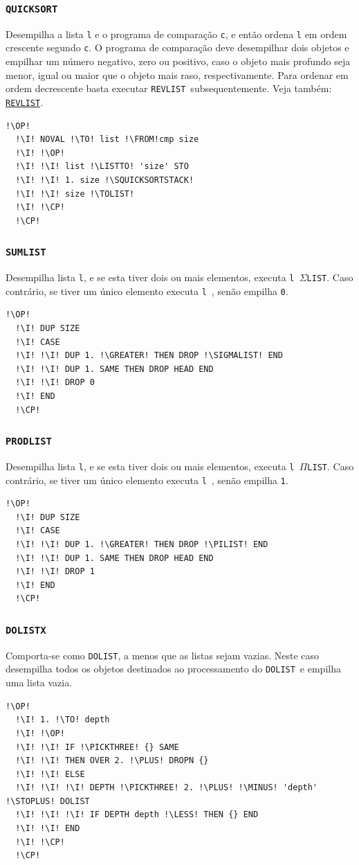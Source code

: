 \documentclass[12pt,a4paper]{report}
\newcommand{\kwd}[1]{\texttt{\textcolor{keyword}{#1}}}
\newcommand{\I}{\enspace\textcolor{indent}\vrule\hspace{2pt}}
\newcommand{\PICKTHREE}{\kwd{PICK3}}   %
\newcommand{\LESS}{\kwd{$<$}}   %
\newcommand{\GREATER}{\kwd{$>$}}   %
\newcommand{\PLUS}{\kwd{+}}   %
\newcommand{\MINUS}{\kwd{-}}   %
\newcommand{\STOPLUS}{\kwd{STO+}} %
\newcommand{\REVLIST}{\kwd{REVLIST}}   %
\newcommand{\TOLIST}{\kwd{$\rightarrow$LIST}} %
\newcommand{\SIGMALIST}{\kwd{$\Sigma$LIST}}   %
\newcommand{\PILIST}{\kwd{$\Pi$LIST}}   %
\newcommand{\DOLIST}{\kwd{DOLIST}} %
\newcommand{\SQUICKSORTSTACK}{\kwd{\$QUICKSORTSTACK}}   %
\newcommand{\QUICKSORT}{\kwd{QUICKSORT}}   %
\newcommand{\SUMLIST}{\kwd{SUMLIST}}   %
\newcommand{\PRODLIST}{\kwd{PRODLIST}}   %
\newcommand{\DOLISTX}{\kwd{DOLISTX}}   %
\newcommand{\OP}{\kwd{$\ll$}}   %
\newcommand{\CP}{\kwd{$\gg$}}   %
\newcommand{\TO}{\kwd{$\rightarrow$}} %
\newcommand{\FROM}{\kwd{$\leftarrow$}} %
\numberwithin{theorem}{chapter}
\begin{document}
\subsubsection{\QUICKSORT}\label{QUICKSORT}
Desempilha a lista \texttt{l} e o programa de comparação \texttt{c}, e
então ordena \texttt{l} em ordem crescente segundo \texttt{c}.  O
programa de comparação deve desempilhar dois objetos e empilhar um
número negativo, zero ou positivo, caso o objeto mais profundo seja
menor, igual ou maior que o objeto mais raso, respectivamente.  Para
ordenar em ordem decrescente basta executar
\REVLIST\ subsequentemente.  Veja também:
\hyperref[REVLIST]{\REVLIST}.
\begin{lstlisting}[language=userrpl]
  !\OP!
  !\I! NOVAL !\TO! list !\FROM!cmp size
  !\I! !\OP!
  !\I! !\I! list !\LISTTO! 'size' STO
  !\I! !\I! 1. size !\SQUICKSORTSTACK!
  !\I! !\I! size !\TOLIST!
  !\I! !\CP!
  !\CP!
\end{lstlisting}

\subsubsection{\SUMLIST}\label{SUMLIST}
Desempilha lista \texttt{l}, e se esta tiver dois ou mais elementos,
executa \texttt{l \SIGMALIST}.  Caso contrário, se tiver um único
elemento executa \texttt{l \HEAD}, senão empilha \texttt{0}.
\begin{lstlisting}[language=userrpl]
  !\OP!
  !\I! DUP SIZE
  !\I! CASE
  !\I! !\I! DUP 1. !\GREATER! THEN DROP !\SIGMALIST! END
  !\I! !\I! DUP 1. SAME THEN DROP HEAD END
  !\I! !\I! DROP 0
  !\I! END
  !\CP!
\end{lstlisting}

\subsubsection{\PRODLIST}\label{PRODLIST}
Desempilha lista \texttt{l}, e se esta tiver dois ou mais elementos,
executa \texttt{l \PILIST}.  Caso contrário, se tiver um único
elemento executa \texttt{l \HEAD}, senão empilha \texttt{1}.
\begin{lstlisting}[language=userrpl]
  !\OP!
  !\I! DUP SIZE
  !\I! CASE
  !\I! !\I! DUP 1. !\GREATER! THEN DROP !\PILIST! END
  !\I! !\I! DUP 1. SAME THEN DROP HEAD END
  !\I! !\I! DROP 1
  !\I! END
  !\CP!
\end{lstlisting}

\subsubsection{\DOLISTX}\label{DOLISTX}
Comporta-se como \DOLIST, a menos que as listas sejam vazias.  Neste
caso desempilha todos os objetos destinados ao processamento do
\DOLIST\ e empilha uma lista vazia.
\begin{lstlisting}[language=userrpl]
  !\OP!
  !\I! 1. !\TO! depth
  !\I! !\OP!
  !\I! !\I! IF !\PICKTHREE! {} SAME
  !\I! !\I! THEN OVER 2. !\PLUS! DROPN {}
  !\I! !\I! ELSE
  !\I! !\I! !\I! DEPTH !\PICKTHREE! 2. !\PLUS! !\MINUS! 'depth' !\STOPLUS! DOLIST
  !\I! !\I! !\I! IF DEPTH depth !\LESS! THEN {} END
  !\I! !\I! END
  !\I! !\CP!
  !\CP!
\end{lstlisting}
\end{document}
